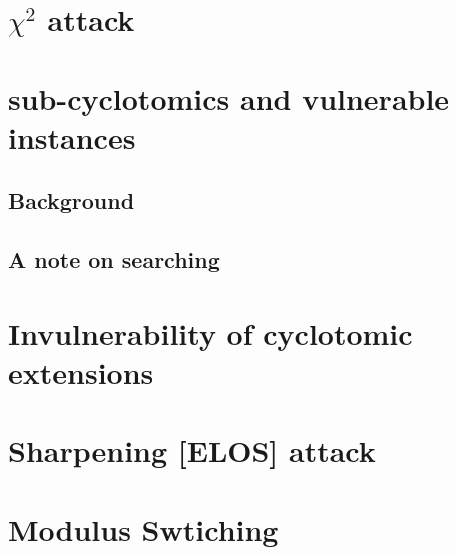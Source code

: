 \documentclass{article}
\begin{document}
\section{$\chi^2$ attack}



\section{sub-cyclotomics and vulnerable instances}

\subsection{Background}

\subsection{A note on searching}

\section{Invulnerability of cyclotomic extensions}

\section{Sharpening [ELOS] attack}

\section{Modulus Swtiching}
\end{document}
